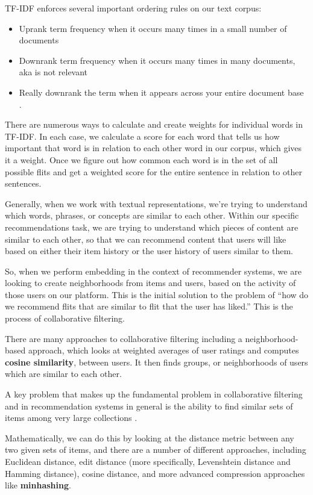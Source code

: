 \documentclass[11pt, table]{diazessay} %
\begin{document}
\begin{sloppypar}
TF-IDF enforces several important ordering rules on our text corpus:

\begin{itemize}
  \item Uprank term frequency when it occurs many times in a small number of documents
  \item Downrank term frequency when it occurs many times in many documents, aka is not relevant
  \item Really downrank the term when it appears across your entire document base \citep{schutze2008introduction}.
\end{itemize}

There are numerous ways to calculate and create weights for individual words in TF-IDF. In each case, we calculate a score for each word that tells us how important that word is in relation to each other word in our corpus, which gives it a weight. Once we figure out how common each word is in the set of all possible flits and get a weighted score for the entire sentence in relation to other sentences.

Generally, when we work with textual representations, we’re trying to understand which words, phrases, or concepts are similar to each other. Within our specific recommendations task, we are trying to understand which pieces of content are similar to each other, so that we can recommend content that users will like based on either their item history or the user history of users similar to them.

So, when we perform embedding in the context of recommender systems, we are looking to create neighborhoods from items and users, based on the activity of those users on our platform.  This is the initial solution to the problem of “how do we recommend flits that are similar to flit that the user has liked.” This is the process of collaborative filtering.

There are many approaches to collaborative filtering including a neighborhood-based approach,  which looks at weighted averages of user ratings and computes \textbf{cosine similarity}, between users.  It then finds groups, or neighborhoods of users which are similar to each other.

A key problem that makes up the fundamental problem in collaborative filtering and in recommendation systems in general is the ability to find similar sets of items among very large collections \citep{leskovec2020mining}.

Mathematically, we can do this by looking at the distance metric between any two given sets of items, and there are a number of different approaches, including  Euclidean distance, edit distance (more specifically, Levenshtein distance and Hamming distance), cosine distance, and more advanced compression approaches like \textbf{minhashing}.


\end{sloppypar}
\end{document}

